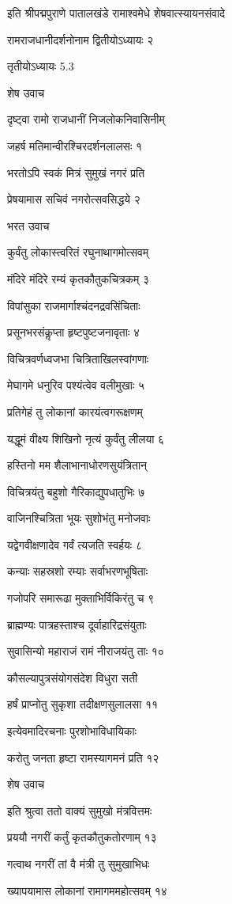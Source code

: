 इति श्रीपद्मपुराणे पातालखंडे रामाश्वमेधे शेषवात्स्यायनसंवादे

रामराजधानीदर्शनोनाम द्वितीयोऽध्यायः २

तृतीयोऽध्यायः 5.3

शेष उवाच

दृष्ट्वा रामो राजधानीं निजलोकनिवासिनीम्

जहर्ष मतिमान्वीरश्चिरदर्शनलालसः १

भरतोऽपि स्वकं मित्रं सुमुखं नगरं प्रति

प्रेषयामास सचिवं नगरोत्सवसिद्धये २

भरत उवाच

कुर्वंतु लोकास्त्वरितं रघुनाथागमोत्सवम्

मंदिरे मंदिरे रम्यं कृतकौतुकचित्रकम् ३

विपांसुका राजमार्गाश्चंदनद्रवसिंचिताः

प्रसूनभरसंकॢप्ता हृष्टपुष्टजनावृताः ४

विचित्रवर्णध्वजभा चित्रिताखिलस्वांगणाः

मेघागमे धनुरिव पश्यंत्वेव वलीमुखाः ५

प्रतिगेहं तु लोकानां कारयंत्वगरूक्षणम्

यद्धूमं वीक्ष्य शिखिनो नृत्यं कुर्वंतु लीलया ६

हस्तिनो मम शैलाभानाधोरणसुयंत्रितान्

विचित्रयंतु बहुशो गैरिकाद्युपधातुभिः ७

वाजिनश्चित्रिता भूयः सुशोभंतु मनोजवाः

यद्वेगवीक्षणादेव गर्वं त्यजति स्वर्हयः ८

कन्याः सहस्रशो रम्याः सर्वाभरणभूषिताः

गजोपरि समारूढा मुक्ताभिर्विकिरंतु च ९

ब्राह्मण्यः पात्रहस्ताश्च दूर्वाहारिद्रसंयुताः

सुवासिन्यो महाराजं रामं नीराजयंतु ताः १०

कौसल्यापुत्रसंयोगसंदेश विधुरा सती

हर्षं प्राप्नोतु सुकृशा तदीक्षणसुलालसा ११

इत्येवमादिरचनाः पुरशोभाविधायिकाः

करोतु जनता हृष्टा रामस्यागमनं प्रति १२

शेष उवाच

इति श्रुत्वा ततो वाक्यं सुमुखो मंत्रवित्तमः

प्रययौ नगरीं कर्तुं कृतकौतुकतोरणाम् १३

गत्वाथ नगरीं तां वै मंत्री तु सुमुखाभिधः

ख्यापयामास लोकानां रामागममहोत्सवम् १४

